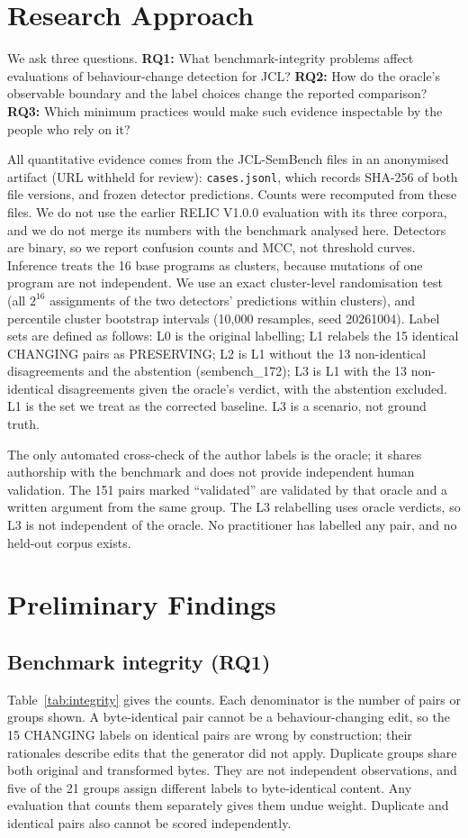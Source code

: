 \documentclass[conference]{IEEEtran}
\begin{document}
\section{Research Approach}
We ask three questions. \textbf{RQ1:} What benchmark-integrity problems affect evaluations of behaviour-change detection for JCL? \textbf{RQ2:} How do the oracle's observable boundary and the label choices change the reported comparison? \textbf{RQ3:} Which minimum practices would make such evidence inspectable by the people who rely on it?

All quantitative evidence comes from the JCL-SemBench files in an anonymised artifact (URL withheld for review): \texttt{cases.jsonl}, which records SHA-256 of both file versions, and frozen detector predictions. Counts were recomputed from these files. We do not use the earlier RELIC V1.0.0 evaluation with its three corpora, and we do not merge its numbers with the benchmark analysed here. Detectors are binary, so we report confusion counts and MCC, not threshold curves. Inference treats the 16 base programs as clusters, because mutations of one program are not independent. We use an exact cluster-level randomisation test (all $2^{16}$ assignments of the two detectors' predictions within clusters), and percentile cluster bootstrap intervals (10{,}000 resamples, seed 20261004). Label sets are defined as follows: L0 is the original labelling; L1 relabels the 15 identical CHANGING pairs as PRESERVING; L2 is L1 without the 13 non-identical disagreements and the abstention (sembench\_172); L3 is L1 with the 13 non-identical disagreements given the oracle's verdict, with the abstention excluded. L1 is the set we treat as the corrected baseline. L3 is a scenario, not ground truth.

The only automated cross-check of the author labels is the oracle; it shares authorship with the benchmark and does not provide independent human validation. The 151 pairs marked ``validated'' are validated by that oracle and a written argument from the same group. The L3 relabelling uses oracle verdicts, so L3 is not independent of the oracle. No practitioner has labelled any pair, and no held-out corpus exists.

\section{Preliminary Findings}
\subsection{Benchmark integrity (RQ1)}
Table~\ref{tab:integrity} gives the counts. Each denominator is the number of pairs or groups shown. A byte-identical pair cannot be a behaviour-changing edit, so the 15 CHANGING labels on identical pairs are wrong by construction; their rationales describe edits that the generator did not apply. Duplicate groups share both original and transformed bytes. They are not independent observations, and five of the 21 groups assign different labels to byte-identical content. Any evaluation that counts them separately gives them undue weight. Duplicate and identical pairs also cannot be scored independently.
\end{document}
